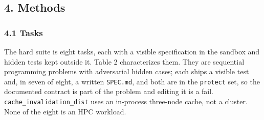\documentclass[
  10pt,
  a4paper,
]{article}
\let\oldtexttt\texttt
\renewcommand{\texttt}[1]{{\small\oldtexttt{#1}}}
\begin{document}
\subsection{4. Methods}\label{methods}

\subsubsection{4.1 Tasks}\label{tasks}

The hard suite is eight tasks, each with a visible specification in the
sandbox and hidden tests kept outside it. Table 2 characterizes them.
They are sequential programming problems with adversarial hidden cases;
each ships a visible test and, in seven of eight, a written
\texttt{SPEC.md}, and both are in the \texttt{protect} set, so the
documented contract is part of the problem and editing it is a fail.
\texttt{cache\_invalidation\_dist} uses an in-process three-node cache,
not a cluster. None of the eight is an HPC workload.
\end{document}
